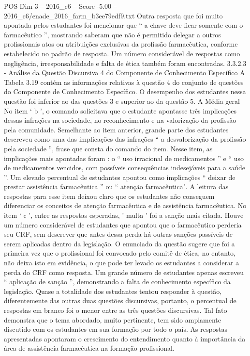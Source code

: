 \begin{textsample}{POS Dim 3 – 2016\_c6 – Score -5.00 – 2016\_c6/enade\_2016\_farm\_b3ee79edf9.txt}
Outra resposta que foi muito apontada pelos estudantes foi mencionar que “ a chave deve ficar somente com o farmacêutico ”, mostrando saberam que não é permitido delegar a outros profissionais atos ou atribuições exclusivas da profissão farmacêutica, conforme estabelecido no padrão de resposta.
Um número considerável de respostas como negligência, irresponsabilidade e falta de ética também foram encontradas. 3.3.2.3 - Análise da Questão Discursiva 4 do Componente de Conhecimento Específico A Tabela 3.19 contém as informações relativas à questão 4 do conjunto de questões do Componente de Conhecimento Específico.
O desempenho dos estudantes nessa questão foi inferior ao das questões 3 e superior ao da questão 5.
A Média geral No item ‘ b ’, o comando solicitava que o estudante apontasse três implicações dessas infrações na sociedade, no reconhecimento e na valorização da profissão pela comunidade.
Semelhante ao item anterior, grande parte dos estudantes descreveu como uma das implicações das infrações “ a desvalorização da profissão pela sociedade ”, frase que consta do comando do item.
Nesse item, as implicações mais apontadas foram : o “ uso irracional de medicamentos ” e “ uso de medicamentos vencidos, com possíveis consequências indesejáveis para a saúde ”.
Um elevado percentual de estudantes apontou como implicações “ deixar de prestar assistência farmacêutica ” ou “ atenção farmacêutica".
A leitura das respostas para esse item deixou claro que os estudantes não conseguem diferenciar os conceitos de atenção farmacêutica e de assistência farmacêutica.
No item ‘ c ’, entre as respostas esperadas, ' multa ' foi a sanção mais citada.
Houve um número considerável de estudantes que apontou que o farmacêutico perderia seu CRF, sem descrever que antes dessa perda há outras sanções passíveis de serem aplicadas dentro da legislação.
O enunciado da questão sugere que foi a primeira vez que o profissional foi convocado pelo comitê de ética, no entanto, não deixa isto em evidência, o que pode ter levado os estudantes a considerar a perda do CRF como resposta.
Um grande número de estudantes apenas escreveu “ aplicação de sanção ”, demonstrando a falta de conhecimento específico da legislação.
Quase a totalidade dos estudantes tentou responder à questão, diferentemente das outras duas questões discursivas, portanto, o percentual de respostas em branco foi o menor entre as três questões discursivas.
Tal fato demonstra que o tema abordado, muito pertinente, tem sido amplamente discutido com os estudantes em sua formação por todo o país.
As respostas apresentadas apontaram o crescimento do entendimento quanto à importância da área de assistência farmacêutica na formação profissional.

\end{textsample}

